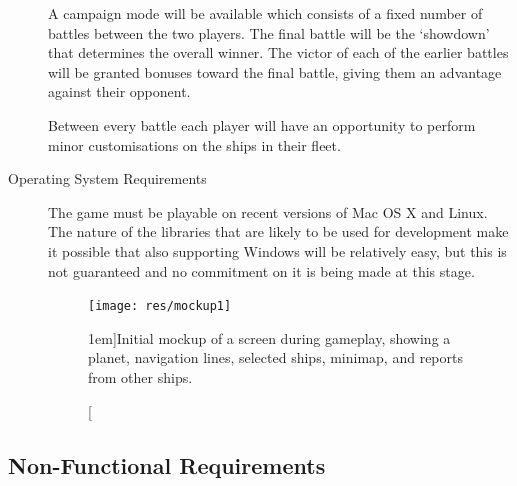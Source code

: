 \begin{description}
	A campaign mode will be available which consists of a fixed number of battles between the two players.
	The final battle will be the `showdown' that determines the overall winner. The victor of each of
	the earlier battles will be granted bonuses toward the final battle, giving them an advantage against
	their opponent.

	Between every battle each player will have an opportunity to perform minor customisations on
	the ships in their fleet.

	\item[Operating System Requirements]

	The game must be playable on recent versions of Mac OS X and Linux. The nature of the libraries that are likely to be used for development make it possible that also supporting Windows will be relatively easy, but this is not guaranteed and no commitment on it is being made at this stage.


\begin{figure}[t!]
	\texttt{[image: res/mockup1]}
	\caption[][1em]{Initial mockup of a screen during gameplay, showing a planet, navigation lines, selected ships, minimap, and reports from other ships.}
	\label{fig:mockup1}
\end{figure}

\end{description}

\subsection{Non-Functional Requirements}

